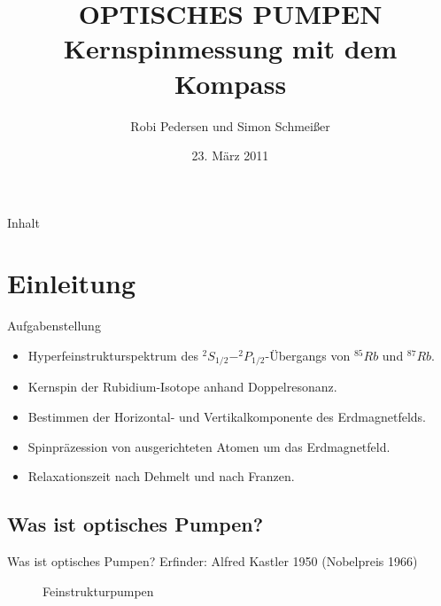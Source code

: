 \documentclass{beamer}
\title[Optisches Pumpen]{OPTISCHES PUMPEN \\ Kernspinmessung mit dem Kompass}
\author{Robi Pedersen und Simon Schmeißer}
\institute{Albert-Ludwigs-Universität Freiburg}
\date{23. März 2011}
\begin{document}
\begin{frame}
\titlepage
\end{frame}

\begin{frame}[shrink]{Inhalt}
\tableofcontents
\end{frame}


\section{Einleitung}

\begin{frame}{Aufgabenstellung} %
\begin{itemize}
\item Hyperfeinstrukturspektrum des $^2S_{1/2} - ^2P_{1/2}$-Übergangs von $^{85}Rb$ und $^{87}Rb$.
\item Kernspin der Rubidium-Isotope anhand Doppelresonanz.
\item Bestimmen der Horizontal- und Vertikalkomponente des Erdmagnetfelds. 
\item Spinpräzession von ausgerichteten Atomen um das Erdmagnetfeld.
\item Relaxationszeit nach Dehmelt und nach Franzen. 
\end{itemize}
\end{frame}


\subsection{Was ist optisches Pumpen?}

\begin{frame}{Was ist optisches Pumpen?}
Erfinder: Alfred Kastler 1950 (Nobelpreis 1966)
	\begin{figure}[H]
	\caption{Feinstrukturpumpen}
	\end{figure}
\end{frame}
\end{document}
